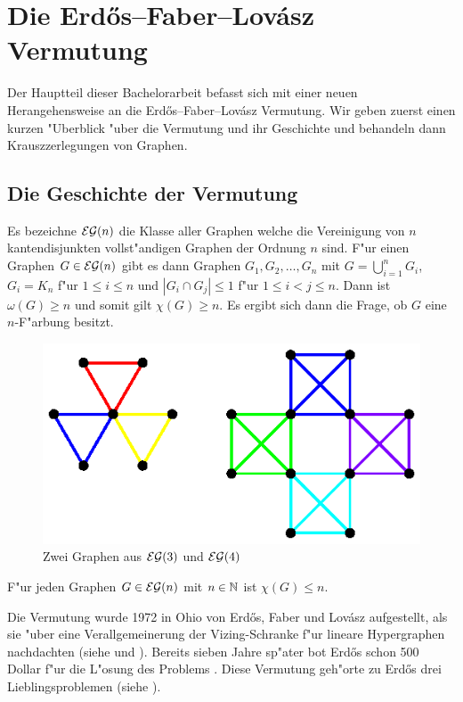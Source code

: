 \section{Die Erd\H{o}s--Faber--Lov\'asz Vermutung}
Der Hauptteil dieser Bachelorarbeit befasst sich mit einer neuen Herangehensweise an die Erd\H{o}s--Faber--Lov\'asz Vermutung. Wir geben zuerst einen kurzen "Uberblick "uber die Vermutung und ihr Geschichte und behandeln dann Krauszzerlegungen von Graphen. 
\subsection{Die Geschichte der Vermutung}
Es bezeichne ${\cal EG}(n)$ die Klasse aller Graphen welche die Vereinigung von $n$ kantendisjunkten vollst"andigen Graphen der Ordnung $n$ sind. 
F"ur einen Graphen $G\in {\cal EG}(n)$ gibt es dann Graphen $G_1,G_2,\dots,G_n$ mit $G= \bigcup\limits_{i=1}^{n} G_i$, $G_i = K_n$ f"ur $1\leq i \leq n$ und $|G_i \cap G_j| \leq 1$ f"ur $1\leq i < j \leq n$. Dann ist $\omega(G) \geq n$ und somit gilt $\chi(G) \geq n$. Es ergibt sich dann die Frage, ob $G$ eine $n$-F"arbung besitzt.
\begin{figure}[h]
  \centering
  \includegraphics{images/bildeg3und4}
  \caption{Zwei Graphen aus ${\cal EG}(3)$ und ${\cal EG}(4)$}
  \label{fig:egraphen}
\end{figure}
\begin{conjecture}
  F"ur jeden Graphen $G\in{\cal EG}(n)$ mit $n\in{\mathbb{N}}$ ist $\chi(G) \leq n$.
  \label{con:efl}
\end{conjecture}
Die Vermutung wurde 1972 in Ohio von Erd\H{o}s, Faber und Lov\'asz aufgestellt, als sie "uber eine Verallgemeinerung der Vizing-Schranke f"ur lineare Hypergraphen nachdachten (siehe \cite{FaberL74} und \cite{Erdos76}). Bereits sieben Jahre sp"ater bot Erd\H{o}s schon 500 Dollar f"ur die L"osung des Problems \cite{Erdos79j}.
Diese Vermutung geh"orte zu Erd\H{o}s drei Lieblingsproblemen (siehe \cite{Erdos81}).

